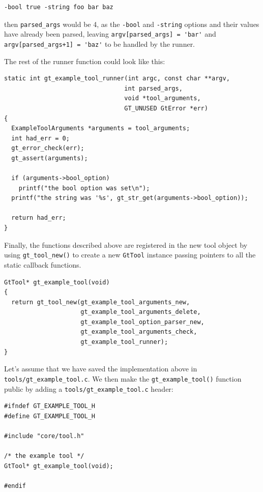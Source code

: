 \documentclass[11pt,final]{article}
\newcommand{\keyword}[1]{\lstinline{#1}}
\begin{document}
\begin{lstlisting}
-bool true -string foo bar baz
\end{lstlisting}

then  \keyword{parsed_args} would be 4, as the \keyword{-bool} and
\keyword{-string} options and their values have already been parsed,
leaving \keyword{argv[parsed_args] = 'bar'} and
\keyword{argv[parsed_args+1] = 'baz'} to be handled by the runner.

The rest of the runner function could look like this:

\begin{lstlisting}
static int gt_example_tool_runner(int argc, const char **argv,
                                 int parsed_args,
                                 void *tool_arguments,
                                 GT_UNUSED GtError *err)
{
  ExampleToolArguments *arguments = tool_arguments;
  int had_err = 0;
  gt_error_check(err);
  gt_assert(arguments);

  if (arguments->bool_option)
    printf("the bool option was set\n");
  printf("the string was '%s', gt_str_get(arguments->bool_option));

  return had_err;
}
\end{lstlisting}

Finally, the functions described above are registered in the new tool object
by using \keyword{gt_tool_new()} to create a new \keyword{GtTool} instance
passing pointers to all the static callback functions.

\begin{lstlisting}
GtTool* gt_example_tool(void)
{
  return gt_tool_new(gt_example_tool_arguments_new,
                     gt_example_tool_arguments_delete,
                     gt_example_tool_option_parser_new,
                     gt_example_tool_arguments_check,
                     gt_example_tool_runner);
}
\end{lstlisting}

Let's assume that we have saved the implementation above in
\keyword{tools/gt_example_tool.c}. We then make the \keyword{gt_example_tool()}
function public by adding a \keyword{tools/gt_example_tool.c} header:

\begin{lstlisting}
#ifndef GT_EXAMPLE_TOOL_H
#define GT_EXAMPLE_TOOL_H

#include "core/tool.h"

/* the example tool */
GtTool* gt_example_tool(void);

#endif
\end{lstlisting}
\end{document}
